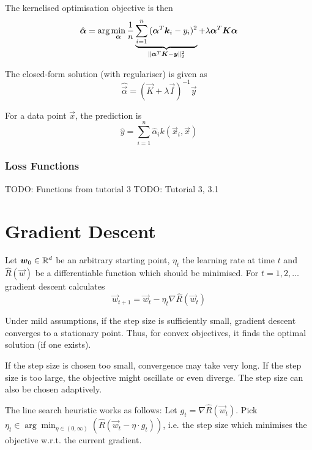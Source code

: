 The kernelised optimisation objective is then
\begin{equation*}
\hat{\boldsymbol{\alpha}} = \arg\min_{\boldsymbol{\alpha}}{
	\frac{1}{n}
	\underbrace{
		\sum_{i=1}^n{
			(\boldsymbol{\alpha}^T \boldsymbol{k}_i - y_i)^2
		}
	}_{\lVert\boldsymbol{\alpha}^T \boldsymbol{K} - \boldsymbol{y}\rVert_2^2}
	+ \lambda \boldsymbol{\alpha}^T \boldsymbol{K} \boldsymbol{\alpha}
}
\end{equation*}

The closed-form solution (with regulariser) is given as
\begin{equation*}
\hat{\vec{\alpha}} = (
\vec{K} + \lambda \vec{I}
)^{-1} \vec{y}
\end{equation*}

For a data point $\vec{x}$, the prediction is
\begin{equation*}
\hat{y} = \sum_{i=1}^n{\hat{\alpha}_i k(\vec{x}_i, \vec{x})}
\end{equation*}


\subsubsection{Loss Functions}
TODO: Functions from tutorial 3
TODO: Tutorial 3, 3.1


\section{Gradient Descent}
Let $\boldsymbol{w}_0 \in \mathbb{R}^d$ be an arbitrary
starting point,
$\eta_t$ the learning rate at time $t$ and
$\hat{R}(\vec{w})$ be a differentiable function
which should be minimised.
For $t = 1, 2, \dotsc$ gradient descent calculates
\begin{equation*}
\vec{w}_{t + 1} = \vec{w}_t - \eta_t
\nabla \hat{R}(\vec{w}_t)
\end{equation*}

Under mild assumptions, if the step size is sufficiently
small, gradient descent converges to a stationary
point.
Thus, for convex objectives, it finds the optimal solution (if one exists).

If the step size is chosen too small, convergence may
take very long.
If the step size is too large, the objective might
oscillate or even diverge.
The step size can also be chosen adaptively.

The line search heuristic works as follows:
Let $g_t = \nabla \hat{R}(\vec{w}_t)$.
Pick $\eta_t \in \arg\min_{\eta \in (0, \infty)}(
\hat{R}(\vec{w}_t - \eta \cdot g_t)
)$,
i.e. the step size which minimises the objective
w.r.t. the current gradient.

